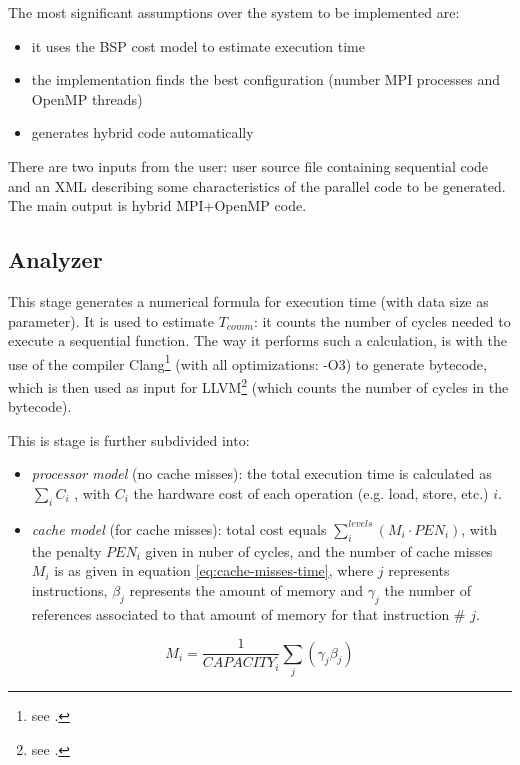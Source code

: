 \documentclass[paper=a4, fontsize=11pt]{scrartcl} %
\numberwithin{equation}{section} %
\numberwithin{figure}{section} %
\numberwithin{table}{section} %
\begin{document}
The most significant assumptions over the system to be implemented are:

\begin{itemize}
\item it uses the BSP cost model to estimate execution time
\item the implementation finds the best configuration (number MPI processes and OpenMP threads)
\item generates hybrid code automatically
\end{itemize}

There are two inputs from the user: user source file containing sequential code and an XML describing some characteristics of the parallel code to be generated. The main output is hybrid MPI+OpenMP code.


\subsection{Analyzer}

This stage generates a numerical formula for execution time (with data size as parameter). It is used to estimate $T_{comm}$: it counts the number of cycles needed to execute a sequential function. The way it performs such a calculation, is with the use of the compiler Clang\footnote{see \cite{clang}.} (with all optimizations: -O3) to generate bytecode, which is then used as input for LLVM\footnote{see \cite{llvm}.} (which counts the number of cycles in the bytecode).

This is stage is further subdivided into:

\begin{itemize}
\item \textit{processor model} (no cache misses): the total execution time is calculated as $\sum_{i}C_{i}$ , with $C_{i}$ the hardware cost of each operation (e.g. load, store, etc.) $i$.
\item \textit{cache model} (for cache misses): total cost equals $\sum_{i}^{levels}(M_{i}{\cdot}PEN_{i})$, with the penalty $PEN_{i}$ given in nuber of cycles, and the number of cache misses $M_{i}$ is as given in equation \ref{eq:cache-misses-time}, where $j$ represents instructions, $\beta_{j}$ represents the amount of memory and $\gamma_{j}$ the number of references associated to that amount of memory for that instruction \# $j$.
\end{itemize}

\begin{equation}
\label{eq:cache-misses-time}
M_{i} = \frac{1}{CAPACITY_{i}}\sum_{j}(\gamma_{j}\beta_{j})
\end{equation}
\end{document}
